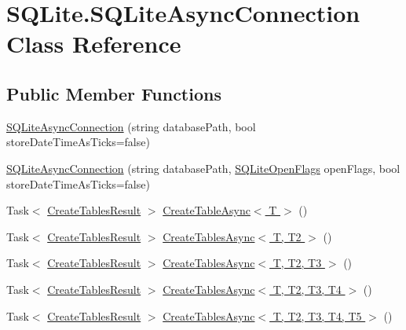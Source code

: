\hypertarget{class_s_q_lite_1_1_s_q_lite_async_connection}{\section{S\+Q\+Lite.\+S\+Q\+Lite\+Async\+Connection Class Reference}
\label{class_s_q_lite_1_1_s_q_lite_async_connection}
}
\subsection*{Public Member Functions}
\begin{DoxyCompactItemize}
\item 
\hyperlink{class_s_q_lite_1_1_s_q_lite_async_connection_a6b26a70d833ede366339dcdf0ac4ddec}{S\+Q\+Lite\+Async\+Connection} (string database\+Path, bool store\+Date\+Time\+As\+Ticks=false)
\item 
\hyperlink{class_s_q_lite_1_1_s_q_lite_async_connection_abf2621d98094e8cc5702655eec267cec}{S\+Q\+Lite\+Async\+Connection} (string database\+Path, \hyperlink{namespace_s_q_lite_a9d72cc097c53dbc96a6f0eec530cc439}{S\+Q\+Lite\+Open\+Flags} open\+Flags, bool store\+Date\+Time\+As\+Ticks=false)
\item 
Task$<$ \hyperlink{class_s_q_lite_1_1_create_tables_result}{Create\+Tables\+Result} $>$ \hyperlink{class_s_q_lite_1_1_s_q_lite_async_connection_a120dc02c80780a01f9158aa2dc4110e3}{Create\+Table\+Async$<$ T $>$} ()
\item 
Task$<$ \hyperlink{class_s_q_lite_1_1_create_tables_result}{Create\+Tables\+Result} $>$ \hyperlink{class_s_q_lite_1_1_s_q_lite_async_connection_a1911c2250387bf7db96a05d4ab73bfe7}{Create\+Tables\+Async$<$ T, T2 $>$} ()
\item 
Task$<$ \hyperlink{class_s_q_lite_1_1_create_tables_result}{Create\+Tables\+Result} $>$ \hyperlink{class_s_q_lite_1_1_s_q_lite_async_connection_a0d18028757d84c1d5ef6b4f0a2f31bf8}{Create\+Tables\+Async$<$ T, T2, T3 $>$} ()
\item 
Task$<$ \hyperlink{class_s_q_lite_1_1_create_tables_result}{Create\+Tables\+Result} $>$ \hyperlink{class_s_q_lite_1_1_s_q_lite_async_connection_a36ed358566d4c64e0bf524c7d8c681a4}{Create\+Tables\+Async$<$ T, T2, T3, T4 $>$} ()
\item 
Task$<$ \hyperlink{class_s_q_lite_1_1_create_tables_result}{Create\+Tables\+Result} $>$ \hyperlink{class_s_q_lite_1_1_s_q_lite_async_connection_a9b3c8584432d04508c89aebbbb1fedea}{Create\+Tables\+Async$<$ T, T2, T3, T4, T5 $>$} ()

\end{DoxyCompactItemize}
